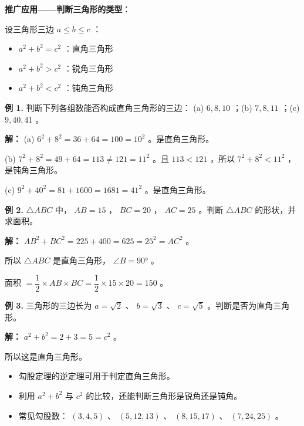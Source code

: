 \textbf{推广应用——判断三角形的类型}：

设三角形三边 $a \leq b \leq c$ ：
\begin{itemize}
  \item $a^2 + b^2 = c^2$ ：直角三角形
  \item $a^2 + b^2 > c^2$ ：锐角三角形
  \item $a^2 + b^2 < c^2$ ：钝角三角形
\end{itemize}


\begin{workedexamples}


\textbf{例 1.} 判断下列各组数能否构成直角三角形的三边：
(a) $6, 8, 10$ ；(b) $7, 8, 11$ ；(c) $9, 40, 41$ 。

\textbf{解：}
(a) $6^2 + 8^2 = 36 + 64 = 100 = 10^2$ 。是直角三角形。

(b) $7^2 + 8^2 = 49 + 64 = 113 \neq 121 = 11^2$ 。且 $113 < 121$ ，所以 $7^2 + 8^2 < 11^2$ ，是钝角三角形。

(c) $9^2 + 40^2 = 81 + 1600 = 1681 = 41^2$ 。是直角三角形。

\textbf{例 2.} $\triangle ABC$ 中， $AB = 15$ ， $BC = 20$ ， $AC = 25$ 。判断 $\triangle ABC$ 的形状，并求面积。

\textbf{解：}
$AB^2 + BC^2 = 225 + 400 = 625 = 25^2 = AC^2$ 。

所以 $\triangle ABC$ 是直角三角形， $\angle B = 90°$ 。

面积 $= \dfrac{1}{2} \times AB \times BC = \dfrac{1}{2} \times 15 \times 20 = 150$ 。

\textbf{例 3.} 三角形的三边长为 $a = \sqrt{2}$ 、 $b = \sqrt{3}$ 、 $c = \sqrt{5}$ 。判断是否为直角三角形。

\textbf{解：}
$a^2 + b^2 = 2 + 3 = 5 = c^2$ 。

所以这是直角三角形。

\end{workedexamples}

\begin{keytakeaway}


\begin{itemize}
  \item 勾股定理的逆定理可用于判定直角三角形。
  \item 利用 $a^2 + b^2$ 与 $c^2$ 的比较，还能判断三角形是锐角还是钝角。
  \item 常见勾股数： $(3,4,5)$ 、 $(5,12,13)$ 、 $(8,15,17)$ 、 $(7,24,25)$ 。
\end{itemize}


\end{keytakeaway}

